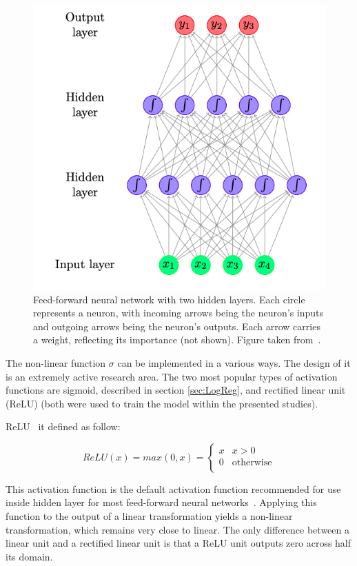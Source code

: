 \begin{figure}[!ht]
\centering
\includegraphics[scale=0.7]{figures/NN.png}
\caption{ Feed-forward neural network with two hidden layers.  Each circle represents a neuron, with incoming arrows being the neuron’s inputs and outgoing arrows being the neuron’s outputs. Each arrow carries a weight, reflecting its importance (not shown). Figure taken from~\cite{text_processing}.
}
\label{fig:NN}
\end{figure} 
 
 
The non-linear function $\sigma$ can be implemented in a various ways. The design of it is an extremely active research area. The two most popular types of activation functions are sigmoid, described in section \ref{sec:LogReg}, and rectified linear unit (ReLU) (both were used to train the model within the presented studies).

ReLU~\cite{relu} it defined as follow: 

\begin{equation}
ReLU(x) = max(0,x)= \left\{ \begin{array}{ll}
x & x>0\\
0 & \textrm{otherwise}\\
\end{array} \right.
\end{equation}

This activation function is the default activation function recommended for use inside hidden layer for most feed-forward neural networks~\cite{DLBook}. Applying this function to the output of a linear transformation yields a non-linear transformation, which remains very close to linear. The only diﬀerence between a linear unit and a rectiﬁed linear unit is that a ReLU unit outputs zero across half its domain. 

